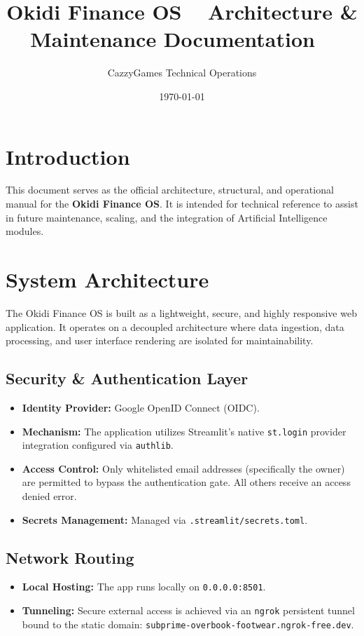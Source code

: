 \documentclass[12pt,a4paper]{article}
\title{
    \vspace{2cm}
    \textbf{\Huge Okidi Finance OS} \
    \vspace{0.5cm}
    \Large Architecture \& Maintenance Documentation \
    \vspace{1cm}
}
\author{CazzyGames Technical Operations}
\date{\today}
\begin{document}
\maketitle
\thispagestyle{empty}
\newpage

\tableofcontents
\newpage

\section{Introduction}
This document serves as the official architecture, structural, and operational manual for the \textbf{Okidi Finance OS}. It is intended for technical reference to assist in future maintenance, scaling, and the integration of Artificial Intelligence modules.

\section{System Architecture}
The Okidi Finance OS is built as a lightweight, secure, and highly responsive web application. It operates on a decoupled architecture where data ingestion, data processing, and user interface rendering are isolated for maintainability.

\subsection{Security \& Authentication Layer}
\begin{itemize}
    \item \textbf{Identity Provider:} Google OpenID Connect (OIDC).
    \item \textbf{Mechanism:} The application utilizes Streamlit's native \texttt{st.login} provider integration configured via \texttt{authlib}.
    \item \textbf{Access Control:} Only whitelisted email addresses (specifically the owner) are permitted to bypass the authentication gate. All others receive an access denied error.
    \item \textbf{Secrets Management:} Managed via \texttt{.streamlit/secrets.toml}.
\end{itemize}

\subsection{Network Routing}
\begin{itemize}
    \item \textbf{Local Hosting:} The app runs locally on \texttt{0.0.0.0:8501}.
    \item \textbf{Tunneling:} Secure external access is achieved via an \texttt{ngrok} persistent tunnel bound to the static domain: \texttt{subprime-overbook-footwear.ngrok-free.dev}.
\end{itemize}
\end{document}
